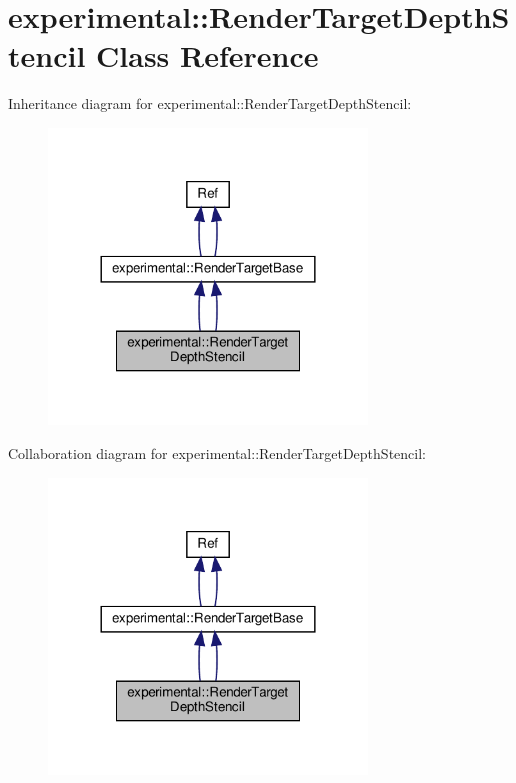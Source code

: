 \hypertarget{classexperimental_1_1RenderTargetDepthStencil}{}\section{experimental\+:\+:Render\+Target\+Depth\+Stencil Class Reference}
\label{classexperimental_1_1RenderTargetDepthStencil}


Inheritance diagram for experimental\+:\+:Render\+Target\+Depth\+Stencil\+:
\nopagebreak
\begin{figure}[H]
\begin{center}
\leavevmode
\includegraphics[width=240pt]{classexperimental_1_1RenderTargetDepthStencil__inherit__graph}
\end{center}
\end{figure}


Collaboration diagram for experimental\+:\+:Render\+Target\+Depth\+Stencil\+:
\nopagebreak
\begin{figure}[H]
\begin{center}
\leavevmode
\includegraphics[width=240pt]{classexperimental_1_1RenderTargetDepthStencil__coll__graph}
\end{center}
\end{figure}
